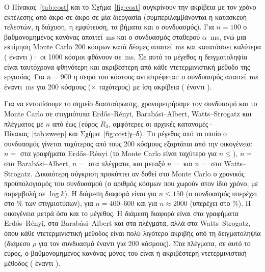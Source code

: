 \documentclass[11pt,a4paper]{article}
\theoremstyle{definition}
\theoremstyle{plain}
\begin{document}
Ο Πίνακας~\ref{tab:cost} και το Σχήμα~\ref{fig:cost} συγκρίνουν την ακρίβεια με τον χρόνο εκτέλεσης από άκρο σε άκρο σε μία διεργασία (συμπεριλαμβάνονται η κατασκευή τελεστών, η διάχυση, η εμφύτευση, τα βήματα και ο συνδυασμός). Για $n=100$ ο βαθμονομημένος κανόνας απαιτεί \CostTestRuleMs\,ms και ο συνδυασμός σταθερού $\alpha$ \CostTestEnsMs\,ms, ενώ μια εκτίμηση Monte Carlo 200 κόσμων κατά δέσμες απαιτεί \CostTestMCTwoHundredMs\,ms και κατατάσσει καλύτερα (\CostTestMCTwoHundredRho{} έναντι \TestLinNine)· οι 1000 κόσμοι φθάνουν \CostTestMCThousandRho{} σε \CostTestMCThousandMs\,ms. Σε αυτό το μέγεθος η δειγματοληψία είναι ταυτόχρονα φθηνότερη και ακριβέστερη από κάθε ντετερμινιστική μέθοδο της εργασίας. Για $n=900$ η σειρά του κόστους αντιστρέφεται: ο συνδυασμός απαιτεί \CostScaleEnsMs\,ms έναντι \CostScaleMCTwoHundredMs\,ms για 200 κόσμους (\CostScaleSpeedup$\times$ ταχύτερος) με ίση ακρίβεια (\ScaleLinNine{} έναντι \CostScaleMCTwoHundredRho).

Για να εντοπίσουμε το σημείο διασταύρωσης, χρονομετρήσαμε τον συνδυασμό και το Monte Carlo σε \SweepN{} στιγμιότυπα Erdős--Rényi, Barabási--Albert, Watts--Strogatz και πλέγματος με $n$ από \SweepNmin{} έως \SweepNmax{} (εύρος $R_3$, αμφότερες οι αρχικές κατανομές· Πίνακας~\ref{tab:sweep} και Σχήμα~\ref{fig:cost}γ--δ). Το μέγεθος από το οποίο ο συνδυασμός γίνεται ταχύτερος από τους 200 κόσμους εξαρτάται από την οικογένεια: $n={}$\CrossER{} στα γραφήματα Erdős--Rényi (το Monte Carlo είναι ταχύτερο για $n\le{}$\CrossERBelow{}), $n={}$\CrossBA{} στα Barabási--Albert, $n={}$\CrossGrid{} στα πλέγματα, και μεταξύ $n={}$\CrossWSBelow{} και $n={}$\CrossWS{} στα Watts--Strogatz. Δικαιότερη σύγκριση προκύπτει αν δοθεί στο Monte Carlo ο χρονικός προϋπολογισμός του συνδυασμού (ο αριθμός κόσμων που χωρούν στον ίδιο χρόνο, με παρεμβολή σε $\log k$). Η διάμεση διαφορά είναι \EqSmall{} για $n\le150$ (ο συνδυασμός υπερέχει στο \EqWinSmall\% των στιγμιοτύπων), \EqMid{} για $n=400$--$600$ και \EqLarge{} για $n\approx2000$ (υπερέχει στο \EqWinLarge\%). Η οικογένεια μετρά όσο και το μέγεθος. Η διάμεση διαφορά είναι \EqBudgetER{} στα γραφήματα Erdős--Rényi, \EqBudgetBA{} στα Barabási--Albert και \EqBudgetGrid{} στα πλέγματα, αλλά \EqBudgetWS{} στα Watts--Strogatz, όπου κάθε ντετερμινιστική μέθοδος είναι πολύ λιγότερο ακριβής από τη δειγματοληψία (διάμεσο $\rho$ \SweepWSEnsRho{} για τον συνδυασμό έναντι \SweepWSMCRho{} για 200 κόσμους). Στα πλέγματα, σε αυτό το εύρος, ο βαθμονομημένος κανόνας μόνος του είναι η ακριβέστερη ντετερμινιστική μέθοδος (\SweepGridRuleRho{} έναντι \SweepGridEnsRho).
\end{document}
